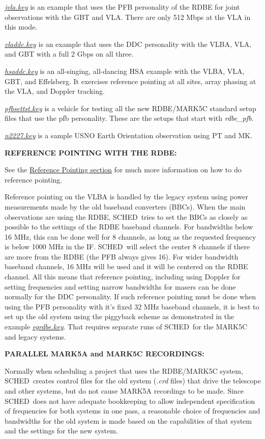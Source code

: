 \documentclass{report}
\newcommand{\schedb}{{\sc SCHED~}}
\begin{document}
{\href{examples/jvla.key}{{\sl jvla.key}}} is an example
that uses the PFB personality of the RDBE for joint observations
with the GBT and VLA.  There are only 512 Mbps at the VLA in this 
mode.

{\href{examples/vladdc.key}{{\sl vladdc.key}}} is an
example that uses the DDC personality with the VLBA, VLA, and GBT 
with a full 2 Gbps on all three.

{\href{examples/hsaddc.key}{{\sl hsaddc.key}}} is an
all-singing, all-dancing HSA example with the VLBA, VLA, GBT, and
Effelsberg.  It exercises reference pointing at all sites, array
phasing at the VLA, and Doppler tracking.

{\href{examples/pfbsettst.key}{{\sl pfbsettst.key}}} is a
vehicle for testing all the new RDBE/MARK5C standard setup files that
use the pfb personality.  These are the setups that start with 
{\sl rdbe\_pfb}.

{\href{examples/n2227.key}{{\sl n2227.key}}} is a
sample USNO Earth Orientation observation using PT and MK.


{\bf REFERENCE POINTING WITH THE RDBE:}

See the 
{\hyperref[SEC:REFPOINT]{Reference Pointing section}} for much
more information on how to do reference pointing.

Reference pointing on the VLBA is handled by the legacy system using
power measurements made by the old baseband converters (BBCs).  When
the main observations are using the RDBE, \schedb tries to set the
BBCs as closely as possible to the settings of the RDBE baseband
channels.  For bandwidths below 16 MHz, this can be done well for 8
channels, as long as the requested frequency is below 1000 MHz in the
IF.  \schedb will select the center 8 channels if there are more from
the RDBE (the PFB always gives 16).  For wider bandwidth baseband
channels, 16 MHz will be used and it will be centered on the RDBE
channel.  All this means that reference pointing, including using
Doppler for setting frequencies and setting narrow bandwidths for
masers can be done normally for the DDC personality.  If such
reference pointing must be done when using the PFB personality with
it's fixed 32 MHz baseband channels, it is best to set up the old
system using the piggyback scheme as demonstrated in the example
{\href{examples/egrdbe.key}{{\sl egrdbe.key}}}.  That
requires separate runs of \schedb for the MARK5C and legacy systems.


{\bf PARALLEL MARK5A and MARK5C RECORDINGS:}

Normally when scheduling a project that uses the RDBE/MARK5C system,
\schedb creates control files for the old system ({\sl .crd} files)
that drive the telescope and other systems, but do not cause MARK5A
recordings to be made.  Since \schedb does not have adequate bookkeeping
to allow independent specification of frequencies for both systems
in one pass, a reasonable choice of frequencies and bandwidths for 
the old system is made based on the capabilities of that system and
the settings for the new system.  
\end{document}
